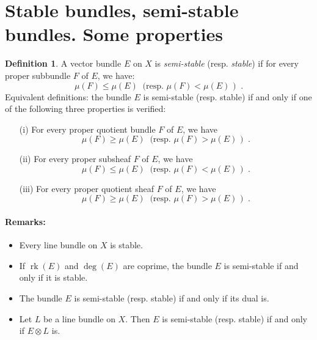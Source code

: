 \documentclass[12pt,a4paper]{book}
\DeclareMathOperator\rk{rk}
\theoremstyle{definition} \newtheorem{defn}[thm]{Definition}
\theoremstyle{definition} \newtheorem{ejs}[thm]{Examples}
\theoremstyle{definition} \newtheorem{ej}[thm]{Example}
\begin{document}
  \section{Stable bundles, semi-stable bundles. Some properties}\label{section 1I}
  \begin{defn}
    A vector bundle $E$ on $X$ is \emph{semi-stable} (resp. \emph{stable}) if for every proper subbundle $F$ of $E$, we have:
    \begin{equation*}
      \mu(F) \leq \mu(E) \  \text{ (resp. $\mu(F)<\mu(E)$ ) }\ .
    \end{equation*}
    Equivalent definitions: the bundle $E$ is semi-stable (resp. stable) if and only if one of the following three properties is verified:
    \begin{itemize}
      \item[(i)] For every proper quotient bundle $F$ of $E$, we have
    \begin{equation*}
      \mu(F) \geq \mu(E) \  \text{ (resp. $\mu(F)>\mu(E)$ ) }\ .
    \end{equation*}
      \item[(ii)] For every proper subsheaf $F$ of $E$, we have
    \begin{equation*}
      \mu(F) \leq \mu(E) \  \text{ (resp. $\mu(F)<\mu(E)$ ) }\ .
    \end{equation*}
      \item[(iii)] For every proper quotient sheaf $F$ of $E$, we have
    \begin{equation*}
      \mu(F) \geq \mu(E) \  \text{ (resp. $\mu(F)>\mu(E)$ ) }\ .
    \end{equation*}
    \end{itemize}
  \end{defn}
  \paragraph{Remarks:}
    \begin{itemize}
      \item 
    Every line bundle on $X$ is stable.
  \item
    If $\rk(E)$ and $\deg(E)$ are coprime, the bundle $E$ is semi-stable if and only if it is stable.
  \item
    The bundle $E$ is semi-stable (resp. stable) if and only if its dual is.
  \item
    Let $L$ be a line bundle on $X$. Then $E$ is semi-stable (resp. stable) if and only if $E\otimes L$ is.
\end{itemize}
\end{document}
